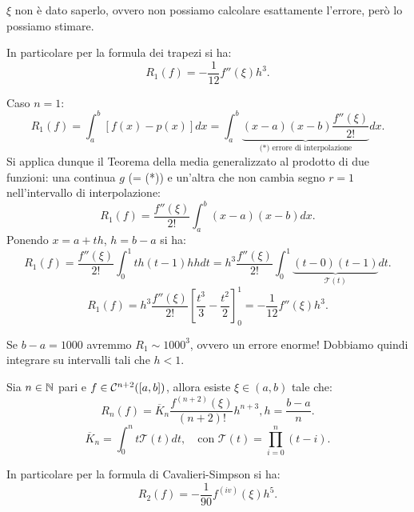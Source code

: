\begin{notabene}
$\xi$ non è dato saperlo, ovvero non possiamo calcolare esattamente l'errore,
però lo possiamo stimare.
\end{notabene}

In particolare per la formula dei trapezi si ha:
\[R_1(f) = - \frac{1}{12}f''(\xi)h^3.\]

\begin{dimo}Caso $n = 1$:
\[
R_1(f) = \int_a^b\left[f(x)-p(x)\right]dx = \int_a^b\underbrace{(x-a)(x-b) 
\frac{f''(\xi)}{2!}}_{\textrm{(*) errore di interpolazione}}dx.
\]
Si applica dunque il Teorema della media generalizzato al prodotto di due 
funzioni: una continua $g$ (= (*)) e un'altra che non cambia segno $r = 1$ 
nell'intervallo di interpolazione:
\[
R_1(f) =\frac{f''(\xi)}{2!}\int_a^b(x-a)(x-b)dx .
\]
Ponendo $x = a +th$, $h = b-a$ si ha:
\[
R_1(f) =\frac{f''(\xi)}{2!}\int_0^1th(t-1)hhdt = h^3\frac{f''(\xi)}{2!}\int_0^1
\underbrace{(t-0)(t-1)}_{\mathcal{T}(t)}dt.
\]
\[
R_1(f) = h^3\frac{f''(\xi)}{2!}\left[\frac{t^3}{3} -\frac{t^2}{2}\right]_0^1
= - \frac{1}{12}f''(\xi)h^3.
\]
\end{dimo}

Se $b-a = 1000$ avremmo $R_1 \sim 1000^3$, ovvero un errore enorme!
Dobbiamo quindi integrare su intervalli tali che $h<1$.

\begin{teo}
Sia $n \in \mathbb{N}$ pari e $f \in \mathcal{C}^{n+2}([a,b])$, allora esiste $\xi \in 
(a,b)$ tale che:
\[
R_n(f) = \overline{K}_n \frac{f^{(n+2)}(\xi)}{(n+2)!} h^{n+3}, 
h = \frac{b-a}{n}.
\]
\[
\overline{K}_n = \int_0^nt\mathcal{T}(t)dt, \quad
\textrm{con } \mathcal{T}(t)= \prod_{i=0}^n(t-i).
\]
\end{teo}
In particolare per la formula di Cavalieri-Simpson si ha:
\[
R_2(f) = -\frac{1}{90}f^{(iv)}(\xi)h^5.
\]

